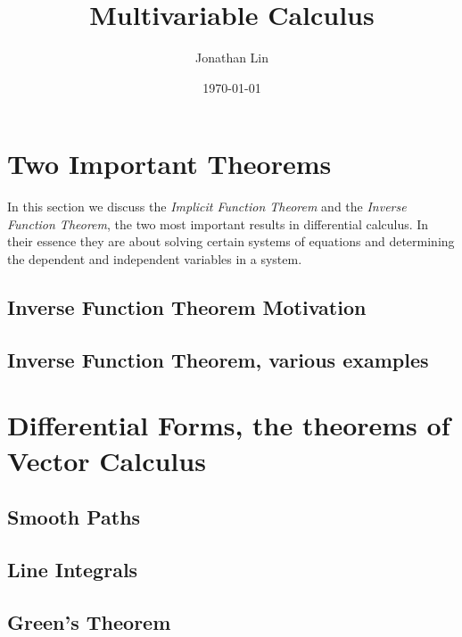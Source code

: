 \documentclass[12pt]{article}
\title{Multivariable Calculus}
\author{Jonathan Lin}
\date{\today}
\theoremstyle{plain}
\theoremstyle{definition}
\begin{document}
\maketitle

\section{Two Important Theorems}

In this section we discuss the \textit{Implicit Function Theorem} and the \textit{Inverse Function Theorem}, the two most important results in differential calculus. In their essence they are about solving certain systems of equations and determining the dependent and independent variables in a system.

\subsection{Inverse Function Theorem Motivation}


\subsection{Inverse Function Theorem, various examples}



\section{Differential Forms, the theorems of Vector Calculus}
\subsection{Smooth Paths}


\subsection{Line Integrals}


\subsection{Green's Theorem}

\end{document}
